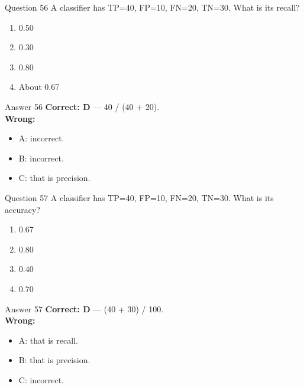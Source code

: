 \documentclass[aspectratio=169,11pt]{beamer}
\begin{document}
\begin{frame}{Question 56}
A classifier has TP=40, FP=10, FN=20, TN=30. What is its recall?
\begin{enumerate}[label=\Alph*.]
\item 0.50
\item 0.30
\item 0.80
\item About 0.67
\end{enumerate}
\end{frame}
\begin{frame}{Answer 56}
\textbf{Correct: D} --- 40 / (40 + 20).\\
\vspace{0.5em}
\textbf{Wrong:}
\begin{itemize}
\item A: incorrect.
\item B: incorrect.
\item C: that is precision.
\end{itemize}
\end{frame}

\begin{frame}{Question 57}
A classifier has TP=40, FP=10, FN=20, TN=30. What is its accuracy?
\begin{enumerate}[label=\Alph*.]
\item 0.67
\item 0.80
\item 0.40
\item 0.70
\end{enumerate}
\end{frame}
\begin{frame}{Answer 57}
\textbf{Correct: D} --- (40 + 30) / 100.\\
\vspace{0.5em}
\textbf{Wrong:}
\begin{itemize}
\item A: that is recall.
\item B: that is precision.
\item C: incorrect.
\end{itemize}
\end{frame}
\end{document}
